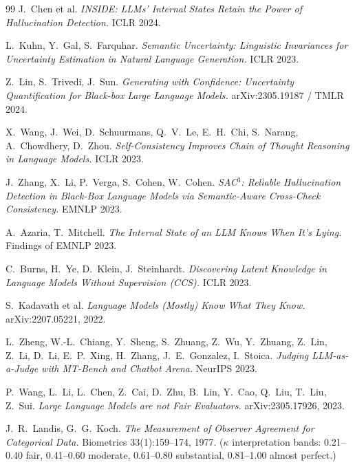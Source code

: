 \documentclass[11pt]{article}
\begin{document}
\begin{thebibliography}{99}
J.~Chen et al.
\textit{INSIDE: LLMs' Internal States Retain the Power of Hallucination
Detection.} ICLR 2024.

L.~Kuhn, Y.~Gal, S.~Farquhar.
\textit{Semantic Uncertainty: Linguistic Invariances for Uncertainty
Estimation in Natural Language Generation.} ICLR 2023.

Z.~Lin, S.~Trivedi, J.~Sun.
\textit{Generating with Confidence: Uncertainty Quantification for
Black-box Large Language Models.} arXiv:2305.19187 / TMLR 2024.

X.~Wang, J.~Wei, D.~Schuurmans, Q.~V.~Le, E.~H.~Chi, S.~Narang, A.~Chowdhery,
D.~Zhou.
\textit{Self-Consistency Improves Chain of Thought Reasoning in Language
Models.} ICLR 2023.

J.~Zhang, X.~Li, P.~Verga, S.~Cohen, W.~Cohen.
\textit{SAC$^3$: Reliable Hallucination Detection in Black-Box Language
Models via Semantic-Aware Cross-Check Consistency.} EMNLP 2023.

A.~Azaria, T.~Mitchell.
\textit{The Internal State of an LLM Knows When It's Lying.} Findings of
EMNLP 2023.

C.~Burns, H.~Ye, D.~Klein, J.~Steinhardt.
\textit{Discovering Latent Knowledge in Language Models Without
Supervision (CCS).} ICLR 2023.

S.~Kadavath et al.
\textit{Language Models (Mostly) Know What They Know.}
arXiv:2207.05221, 2022.

L.~Zheng, W.-L.~Chiang, Y.~Sheng, S.~Zhuang, Z.~Wu, Y.~Zhuang, Z.~Lin,
Z.~Li, D.~Li, E.~P.~Xing, H.~Zhang, J.~E.~Gonzalez, I.~Stoica.
\textit{Judging LLM-as-a-Judge with MT-Bench and Chatbot Arena.}
NeurIPS 2023.

P.~Wang, L.~Li, L.~Chen, Z.~Cai, D.~Zhu, B.~Lin, Y.~Cao, Q.~Liu, T.~Liu,
Z.~Sui.
\textit{Large Language Models are not Fair Evaluators.}
arXiv:2305.17926, 2023.

J.~R.~Landis, G.~G.~Koch.
\textit{The Measurement of Observer Agreement for Categorical Data.}
Biometrics 33(1):159--174, 1977. ($\kappa$ interpretation bands:
0.21--0.40 fair, 0.41--0.60 moderate, 0.61--0.80 substantial,
0.81--1.00 almost perfect.)


\end{thebibliography}
\end{document}
